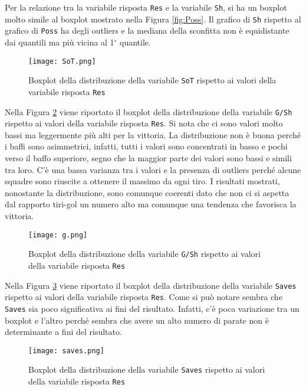 Per la relazione tra la variabile risposta \texttt{Res} e la variabile \texttt{Sh}, si ha un boxplot molto simile al boxplot mostrato nella Figura \ref{fig:Poss}. Il grafico di \texttt{Sh} rispetto al grafico di \texttt{Poss} ha degli outliers e la mediana della sconfitta non è equidistante dai quantili ma più vicina al 1$^{\circ}$ quantile.\\
\begin{figure}[htbp]
	\begin{center}
		\texttt{[image: SoT.png]}
		\caption{Boxplot della distribuzione della variabile \texttt{SoT} rispetto ai valori della variabile risposta \texttt{Res} } \label{fig:sot}
	\end{center}
\end{figure}
Nella Figura \ref{fig:g} viene riportato il boxplot della distribuzione della variabile \texttt{G/Sh} rispetto ai valori della variabile risposta \texttt{Res}. Si nota che ci sono valori molto bassi ma leggermente più alti per la vittoria. La distribuzione non è buona perché i baffi sono asimmetrici, infatti, tutti i valori sono concentrati in basso e pochi verso il baffo superiore, segno che la maggior parte dei valori sono bassi e simili tra loro. C'è una bassa varianza tra i valori e la presenza di outliers perché alcune squadre sono riuscite a ottenere il massimo da ogni tiro. I risultati mostrati, nonostante la distribuzione, sono comunque coerenti dato che non ci si aspetta dal rapporto tiri-gol un numero alto ma comunque una tendenza che favorisca la vittoria.\\
\begin{figure}[htbp]
	\begin{center}
		\texttt{[image: g.png]}
		\caption{Boxplot della distribuzione della variabile \texttt{G/Sh} rispetto ai valori della variabile risposta \texttt{Res} } \label{fig:g}
	\end{center}
\end{figure}
Nella Figura \ref{fig:saves} viene riportato il boxplot della distribuzione della variabile \texttt{Saves} rispetto ai valori della variabile risposta \texttt{Res}. Come si può notare sembra che \texttt{Saves} sia poco significativa ai fini del risultato. Infatti, c'è poca variazione tra un boxplot e l'altro perché sembra che avere un alto numero di parate non è determinante a fini del risultato.\\
\begin{figure}[htbp]
	\begin{center}
		\texttt{[image: saves.png]}
		\caption{Boxplot della distribuzione della variabile \texttt{Saves} rispetto ai valori della variabile risposta \texttt{Res} } \label{fig:saves}
	\end{center}
\end{figure}
